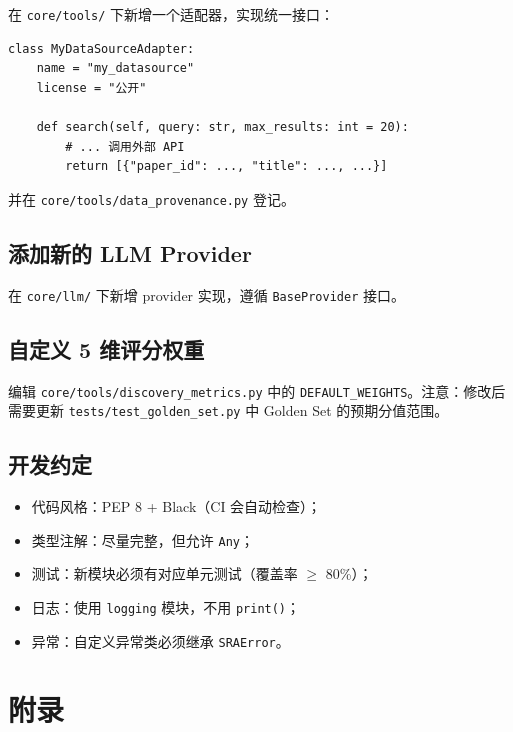 \documentclass[11pt,a4paper]{article}
\begin{document}
在 \texttt{core/tools/} 下新增一个适配器，实现统一接口：

\begin{verbatim}
class MyDataSourceAdapter:
    name = "my_datasource"
    license = "公开"
    
    def search(self, query: str, max_results: int = 20):
        # ... 调用外部 API
        return [{"paper_id": ..., "title": ..., ...}]
\end{verbatim}

并在 \texttt{core/tools/data\_provenance.py} 登记。

\subsection{添加新的 LLM Provider}

在 \texttt{core/llm/} 下新增 provider 实现，遵循 \texttt{BaseProvider} 接口。

\subsection{自定义 5 维评分权重}

编辑 \texttt{core/tools/discovery\_metrics.py} 中的 \texttt{DEFAULT\_WEIGHTS}。注意：修改后需要更新 \texttt{tests/test\_golden\_set.py} 中 Golden Set 的预期分值范围。

\subsection{开发约定}

\begin{itemize}[leftmargin=2em]
\item 代码风格：PEP 8 + Black（CI 会自动检查）；
\item 类型注解：尽量完整，但允许 \texttt{Any}；
\item 测试：新模块必须有对应单元测试（覆盖率 $\geq$ 80\%）；
\item 日志：使用 \texttt{logging} 模块，不用 \texttt{print()}；
\item 异常：自定义异常类必须继承 \texttt{SRAError}。
\end{itemize}

\section{附录}
\end{document}
